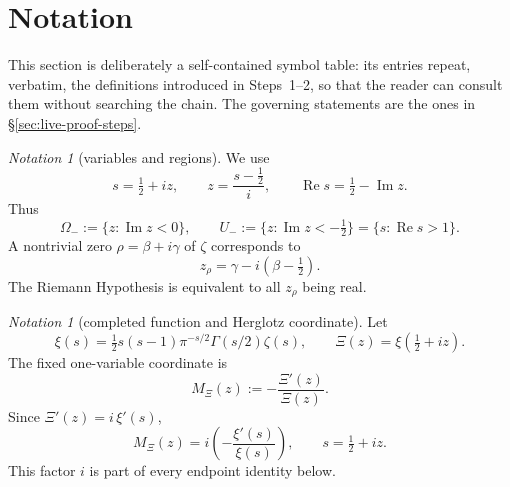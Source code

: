 \documentclass[11pt]{amsart}
\theoremstyle{definition}
\theoremstyle{remark}
\newtheorem{notation}[theorem]{Notation}
\theoremstyle{definition}
\renewcommand{\Re}{\operatorname{Re}}
\renewcommand{\Im}{\operatorname{Im}}
\newcommand{\half}{\tfrac{1}{2}}
\begin{document}
\section{Notation}\label{sec:notation}

This section is deliberately a self-contained symbol table: its entries repeat, verbatim, the
definitions introduced in Steps~1--2, so that the reader can consult them without searching the chain.
The governing statements are the ones in \S\ref{sec:live-proof-steps}.

\begin{notation}[variables and regions]\label{not:variables}
We use
\[
   s=\half+iz,\qquad z=\frac{s-\half}{i},\qquad
   \Re s=\half-\Im z.
\]
Thus
\[
   \Omega_-:=\{z:\Im z<0\},\qquad
   U_-:=\{z:\Im z<-\half\}=\{s:\Re s>1\}.
\]
A nontrivial zero $\rho=\beta+i\gamma$ of $\zeta$ corresponds to
\[
   z_\rho=\gamma-i(\beta-\half).
\]
The Riemann Hypothesis is equivalent to all $z_\rho$ being real.
\end{notation}

\begin{notation}[completed function and Herglotz coordinate]\label{not:xi}
Let
\[
   \xi(s)=\half s(s-1)\pi^{-s/2}\Gamma(s/2)\zeta(s),\qquad
   \Xi(z)=\xi(\half+iz).
\]
The fixed one-variable coordinate is
\[
   M_\Xi(z):=-\frac{\Xi'(z)}{\Xi(z)}.
\]
Since $\Xi'(z)=i\,\xi'(s)$,
\begin{equation}\label{eq:change}
   M_\Xi(z)=i\left(-\frac{\xi'(s)}{\xi(s)}\right),\qquad s=\half+iz.
\end{equation}
This factor $i$ is part of every endpoint identity below.
\end{notation}
\end{document}
